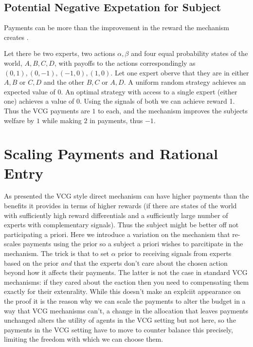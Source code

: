 \subsection{Potential Negative Expetation for Subject}

Payments can be more than the improvement in the reward the mechanism creates . 

\begin{eg}
	Let there be two experts, two actions ${\alpha,\beta}$ and four equal probability states of the world, ${A,B,C,D}$, with payoffs to the actions correspondingly as ${(0,1),(0,-1),(-1,0),(1,0)}$. Let one expert oberve that they are in either ${A,B}$ or ${C,D}$ and the other ${B,C}$ or ${A,D}$. A uniform random strategy achieves an expected value of 0. An optimal strategy with access to a single expert (either one) achieves a value of 0. Using the signals of both we can achieve reward 1. Thus the VCG payments are $1$ to each, and the mechanism improves the subjects welfare by $1$ while making $2$ in payments, thus $-1$. 
\end{eg}




\section{Scaling Payments and Rational Entry}

As presented the VCG style direct mechanism can have higher payments than the benefits it provides in terms of higher rewards (if there are states of the world with sufficiently high reward differentials and a sufficiently large number of experts with complementary signals). Thus the subject might be better off not participating a priori. Here we introduce a variation on the mechanism that re-scales payments using the prior so a subject a priori wishes to parcitipate in the mechanism. The trick is that to set $\alpha$ prior to receiving signals from experts based on the prior \emph{and} that the experts don't care about the chosen action beyond how it affects their payments. The latter is not the case in standard VCG mechanisms: if they cared about the eaction then you need to compensating them exactly for their extenrality. While this doesn't make an explciit appearance on the proof it is the reason why we can scale the payments to alter the budget in a way that VCG mechanisms can't, a change in the allocation that leaves payments unchanged alters the utility of agents in the VCG setting but not here, so the payments in the VCG setting have to move to counter balance this precisely, limiting the freedom with which we can choose them.

